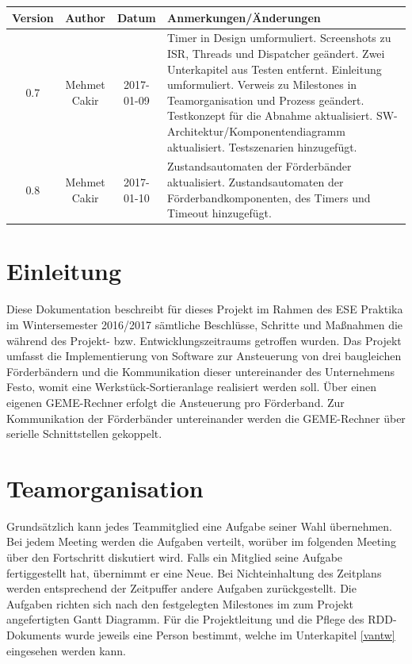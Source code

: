 \documentclass[a4paper, 11pt]{article}
\begin{document}
\newpage

\begin{table}[H]
    \begin{tabularx}{\textwidth}{|c|c|c|X|}
    \hline
    \textbf{Version} & \textbf{Author} & \textbf{Datum} & \centering \arraybackslash \textbf{Anmerkungen/Änderungen}\\
    \hline
    0.7&Mehmet Cakir&2017-01-09&Timer in Design umformuliert. Screenshots zu ISR, Threads und Dispatcher geändert. Zwei Unterkapitel aus Testen entfernt. Einleitung umformuliert. Verweis zu Milestones in Teamorganisation und Prozess geändert. Testkonzept für die Abnahme aktualisiert. SW-Architektur/Komponentendiagramm aktualisiert. Testszenarien hinzugefügt.\\
    \hline
    0.8&Mehmet Cakir&2017-01-10&Zustandsautomaten der Förderbänder aktualisiert. Zustandsautomaten der Förderbandkomponenten, des Timers und Timeout hinzugefügt.\\
    \hline
    \end{tabularx}
\label{changes}
\end{table}

\newpage

\tableofcontents

\newpage

\section{Einleitung}
Diese Dokumentation beschreibt für dieses Projekt im Rahmen des ESE Praktika im Wintersemester 2016/2017 sämtliche Beschlüsse, Schritte und Maßnahmen die während des Projekt- bzw. Entwicklungszeitraums getroffen wurden. Das Projekt umfasst die Implementierung von Software zur Ansteuerung von drei baugleichen Förderbändern und die Kommunikation dieser untereinander des Unternehmens Festo, womit eine Werkstück-Sortieranlage realisiert werden soll. Über einen eigenen GEME-Rechner erfolgt die Ansteuerung pro Förderband. Zur Kommunikation der Förderbänder untereinander werden die GEME-Rechner über serielle Schnittstellen gekoppelt.

\section{Teamorganisation}
Grundsätzlich kann jedes Teammitglied eine Aufgabe seiner Wahl übernehmen. Bei jedem Meeting werden die Aufgaben verteilt, worüber im folgenden Meeting über den Fortschritt diskutiert wird. Falls ein Mitglied seine Aufgabe fertiggestellt hat, übernimmt er eine Neue. Bei Nichteinhaltung des Zeitplans werden entsprechend der Zeitpuffer andere Aufgaben zurückgestellt. Die Aufgaben richten sich nach den festgelegten Milestones im zum Projekt angefertigten Gantt Diagramm. Für die Projektleitung und die Pflege des RDD-Dokuments wurde jeweils eine Person bestimmt, welche im Unterkapitel \ref{vantw} eingesehen werden kann.
\end{document}
